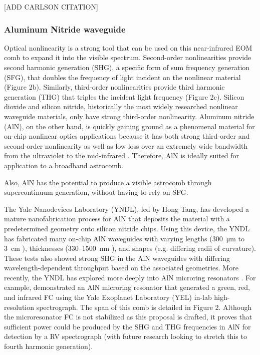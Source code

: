 \documentclass[11pt]{article}
\begin{document}
[ADD CARLSON CITATION]

\subsubsection{Aluminum Nitride waveguide}

Optical nonlinearity is a strong tool that can be used on this near-infrared EOM comb to expand it into the visible spectrum. Second-order nonlinearities provide second harmonic generation (SHG), a specific form of sum frequency generation (SFG), that doubles the frequency of light incident on the nonlinear material (Figure 2b). Similarly, third-order nonlinearities provide third harmonic generation (THG) that triples the incident light frequency (Figure 2c). Silicon dioxide and silicon nitride, historically the most widely researched nonlinear waveguide materials, only have strong third-order nonlinearity. Aluminum nitride (AlN), on the other hand, is quickly gaining ground as a phenomenal material for on-chip nonlinear optics applications because it has both strong third-order and second-order nonlinearity as well as low loss over an extremely wide bandwidth from the ultraviolet to the mid-infrared \citep{Jung2016}. Therefore, AlN is ideally suited for application to a broadband astrocomb.

Also, AlN has the potential to produce a visible astrocomb through supercontinuum generation, without having to rely on SFG.

The Yale Nanodevices Laboratory (YNDL), led by Hong Tang, has developed a mature nanofabrication process for AlN that deposits the material with a predetermined geometry onto silicon nitride chips. Using this device, the YNDL has fabricated many on-chip AlN waveguides with varying lengths (\SI{300}{\micro\meter} to \SI{3}{\centi\meter} \citep{Xiong2012a}), thicknesses (330--\SI{1500}{\nano\meter} \citep{Pernice2012}), and shapes (e.g. differing radii of curvature). These tests also showed strong SHG in the AlN waveguides with differing wavelength-dependent throughput based on the associated geometries. More recently, the YNDL has explored more deeply into AlN microring resonators \citep{Jung2013, Guo2016}. For example, \citep{Jung2014a} demonstrated an AlN microring resonator that generated a green, red, and infrared FC using the Yale Exoplanet Laboratory (YEL) in-lab high-resolution spectrograph. The span of this comb is detailed in Figure 2. Although the microresonator FC is not stabilized as this proposal is drafted, it proves that sufficient power could be produced by the SHG and THG frequencies in AlN for detection by a RV spectrograph (with future research looking to stretch this to fourth harmonic generation).
\end{document}
